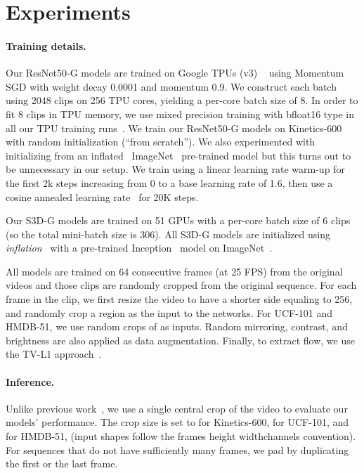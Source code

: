 \documentclass[letterpaper]{article} \usepackage{aaai21}  \usepackage{times}  \usepackage{helvet} \usepackage{courier}  \usepackage[hyphens]{url}  \usepackage{graphicx} \urlstyle{rm} \def\UrlFont{\rm}  \usepackage{natbib}  \usepackage{caption} \frenchspacing  \setlength{\pdfpagewidth}{8.5in}  \setlength{\pdfpageheight}{11in}
\begin{document}
\section{Experiments}
\label{sec:experiments}
\paragraph{Training details.}
Our ResNet50-G models are trained on Google TPUs (v3) ~\cite{kumar2019scale} using Momentum SGD with weight decay 0.0001 and momentum 0.9.  We construct each batch using 2048 clips on 256 TPU cores, yielding a per-core batch size of 8. In order to fit 8 clips in TPU memory, we use mixed precision training with bfloat16 type in all our TPU training runs~\cite{wang2019bfloat16}. We train our ResNet50-G models on Kinetics-600 with random initialization (``from scratch''). We also experimented with initializing from an inflated~\cite{carreira2017quo} ImageNet~\cite{deng2009imagenet} pre-trained model but this turns out to be unnecessary in our setup. We train using a linear learning rate warm-up for the first 2k steps increasing from 0 to a base learning rate of 1.6, then use a cosine annealed learning rate~\cite{loshchilov2016sgdr} for 20K steps. 

Our S3D-G models are trained on 51 GPUs with a per-core batch size of 6 clips (so the total mini-batch size is 306). All S3D-G models are initialized using \emph{inflation}~\cite{carreira2017quo} with a pre-trained Inception~\cite{Szegedy1} model on ImageNet~\cite{deng2009imagenet}.

All models are trained on 64 consecutive frames (at 25 FPS) from the original videos and those clips are randomly cropped from the original sequence. For each frame in the clip, we first resize the video to have a shorter side equaling to 256, and randomly crop a  region as the input to the networks. For UCF-101 and HMDB-51, we use random crops of  as inputs. Random mirroring, contrast, and brightness are also applied as data augmentation. 
Finally, to extract flow, we use the TV-L1 approach~\cite{tvl1_flow}.

\vspace{-0.5cm}
\paragraph{Inference.} Unlike previous work~\cite{wang2018non,feichtenhofer2019slowfast}, we use a single central crop of the video to evaluate our models' performance. The crop size is set to  for Kinetics-600,  for UCF-101, and  for HMDB-51, (input shapes follow the frames height widthchannels convention). For sequences that do not have sufficiently many frames, we pad by duplicating the first or the last frame. 
\end{document}
